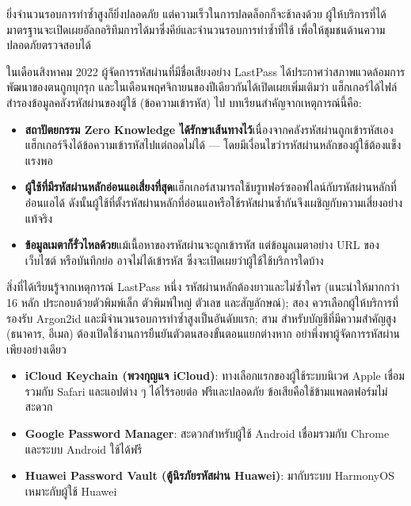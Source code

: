 ยิ่งจำนวนรอบการทำซ้ำสูงก็ยิ่งปลอดภัย แต่ความเร็วในการปลดล็อกก็จะช้าลงด้วย ผู้ให้บริการที่ได้มาตรฐานจะเปิดเผยอัลกอริทึมการได้มาซึ่งคีย์และจำนวนรอบการทำซ้ำที่ใช้ เพื่อให้ชุมชนด้านความปลอดภัยตรวจสอบได้


ในเดือนสิงหาคม 2022 ผู้จัดการรหัสผ่านที่มีชื่อเสียงอย่าง LastPass ได้ประกาศว่าสภาพแวดล้อมการพัฒนาของตนถูกบุกรุก และในเดือนพฤศจิกายนของปีเดียวกันได้เปิดเผยเพิ่มเติมว่า แฮ็กเกอร์ได้ไฟล์สำรองข้อมูลคลังรหัสผ่านของผู้ใช้ (ข้อความเข้ารหัส) ไป บทเรียนสำคัญจากเหตุการณ์นี้คือ:

\begin{itemize}
  \item \textbf{สถาปัตยกรรม Zero Knowledge ได้รักษาเส้นทางไว้}เนื่องจากคลังรหัสผ่านถูกเข้ารหัสเอง แฮ็กเกอร์จึงได้ข้อความเข้ารหัสไปแต่ถอดไม่ได้ — โดยมีเงื่อนไขว่ารหัสผ่านหลักของผู้ใช้ต้องแข็งแรงพอ
  \item \textbf{ผู้ใช้ที่มีรหัสผ่านหลักอ่อนแอเสี่ยงที่สุด}แฮ็กเกอร์สามารถใช้บรูทฟอร์ซออฟไลน์กับรหัสผ่านหลักที่อ่อนแอได้ ดังนั้นผู้ใช้ที่ตั้งรหัสผ่านหลักที่อ่อนแอหรือใช้รหัสผ่านซ้ำกันจึงเผชิญกับความเสี่ยงอย่างแท้จริง
  \item \textbf{ข้อมูลเมตาก็รั่วไหลด้วย}แม้เนื้อหาของรหัสผ่านจะถูกเข้ารหัส แต่ข้อมูลเมตาอย่าง URL ของเว็บไซต์ หรือบันทึกย่อ อาจไม่ได้เข้ารหัส ซึ่งจะเปิดเผยว่าผู้ใช้ใช้บริการใดบ้าง
\end{itemize}

\begin{tcbwarn}{สิ่งที่ได้เรียนรู้จากเหตุการณ์ LastPass}
หนึ่ง รหัสผ่านหลักต้องยาวและไม่ซ้ำใคร (แนะนำให้มากกว่า 16 หลัก ประกอบด้วยตัวพิมพ์เล็ก ตัวพิมพ์ใหญ่ ตัวเลข และสัญลักษณ์); สอง ควรเลือกผู้ให้บริการที่รองรับ Argon2id และมีจำนวนรอบการทำซ้ำสูงเป็นอันดับแรก; สาม สำหรับบัญชีที่มีความสำคัญสูง (ธนาคาร, อีเมล) ต้องเปิดใช้งานการยืนยันตัวตนสองขั้นตอนแยกต่างหาก อย่าพึ่งพาผู้จัดการรหัสผ่านเพียงอย่างเดียว

\end{tcbwarn}



\begin{itemize}
  \item \textbf{iCloud Keychain (พวงกุญแจ iCloud)}: ทางเลือกแรกของผู้ใช้ระบบนิเวศ Apple เชื่อมรวมกับ Safari และแอปต่าง ๆ ได้ไร้รอยต่อ ฟรีและปลอดภัย ข้อเสียคือใช้ข้ามแพลตฟอร์มไม่สะดวก
  \item \textbf{Google Password Manager}: สะดวกสำหรับผู้ใช้ Android เชื่อมรวมกับ Chrome และระบบ Android ใช้ได้ฟรี
  \item \textbf{Huawei Password Vault (ตู้นิรภัยรหัสผ่าน Huawei)}: มากับระบบ HarmonyOS เหมาะกับผู้ใช้ Huawei
\end{itemize}


